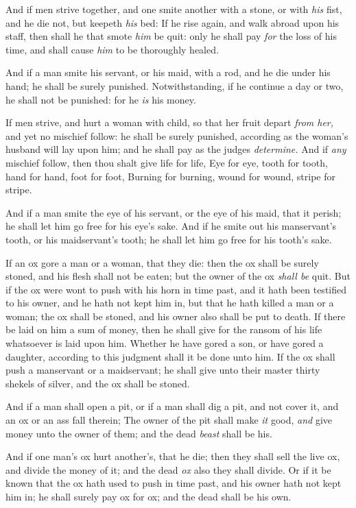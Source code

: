 \documentclass[11pt,letterpaper,oneside]{memoir}
\begin{document}
And if men strive together, and one smite another with a stone, or with
\emph{his} fist, and he die not, but keepeth \emph{his} bed: If he rise
again, and walk abroad upon his staff, then shall he that smote
\emph{him} be quit: only he shall pay \emph{for} the loss of his time,
and shall cause \emph{him} to be thoroughly healed.

And if a man smite his servant, or his maid, with a rod, and he die
under his hand; he shall be surely punished. Notwithstanding, if he
continue a day or two, he shall not be punished: for he \emph{is} his
money.

If men strive, and hurt a woman with child, so that her fruit depart
\emph{from her,} and yet no mischief follow: he shall be surely
punished, according as the woman's husband will lay upon him; and he
shall pay as the judges \emph{determine. }And if \emph{any} mischief
follow, then thou shalt give life for life, Eye for eye, tooth for
tooth, hand for hand, foot for foot, Burning for burning, wound for
wound, stripe for stripe.

And if a man smite the eye of his servant, or the eye of his maid, that
it perish; he shall let him go free for his eye's sake. And if he smite
out his manservant's tooth, or his maidservant's tooth; he shall let him
go free for his tooth's sake.

If an ox gore a man or a woman, that they die: then the ox shall be
surely stoned, and his flesh shall not be eaten; but the owner of the ox
\emph{shall be} quit. But if the ox were wont to push with his horn in
time past, and it hath been testified to his owner, and he hath not kept
him in, but that he hath killed a man or a woman; the ox shall be
stoned, and his owner also shall be put to death. If there be laid on
him a sum of money, then he shall give for the ransom of his life
whatsoever is laid upon him. Whether he have gored a son, or have gored
a daughter, according to this judgment shall it be done unto him. If the
ox shall push a manservant or a maidservant; he shall give unto their
master thirty shekels of silver, and the ox shall be stoned.

And if a man shall open a pit, or if a man shall dig a pit, and not
cover it, and an ox or an ass fall therein; The owner of the pit shall
make \emph{it} good, \emph{and} give money unto the owner of them; and
the dead \emph{beast} shall be his.

And if one man's ox hurt another's, that he die; then they shall sell
the live ox, and divide the money of it; and the dead \emph{ox} also
they shall divide. Or if it be known that the ox hath used to push in
time past, and his owner hath not kept him in; he shall surely pay ox
for ox; and the dead shall be his own.
\end{document}
